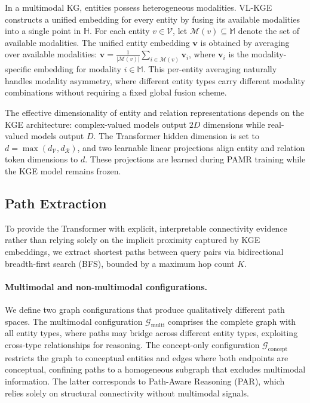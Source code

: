 \documentclass[runningheads]{llncs}
\begin{document}
In a multimodal KG, entities possess heterogeneous modalities.
VL-KGE~\cite{efthymiou2026vlkge} constructs a unified embedding for
every entity by fusing its available modalities into a single point
in $\mathbb{H}$.  For each entity $v \in \mathcal{V}$, let
$\mathcal{M}(v) \subseteq \mathbb{M}$ denote the set of available
modalities.  The unified entity embedding $\mathbf{v}$ is obtained
by averaging over available modalities:
$\mathbf{v} = \frac{1}{|\mathcal{M}(v)|} \sum_{i \in \mathcal{M}(v)} \mathbf{v}_i$,
where $\mathbf{v}_i$ is the modality-specific embedding for modality
$i \in \mathbb{M}$.  This per-entity averaging naturally handles
modality asymmetry, where different entity types carry different
modality combinations without requiring a fixed global fusion scheme.

The effective dimensionality of entity and relation representations
depends on the KGE architecture: complex-valued models output $2D$
dimensions while real-valued models output $D$. The Transformer
hidden dimension is set to $d = \max(d_{\mathcal{V}},
d_{\mathcal{R}})$, and two learnable linear projections align entity
and relation token dimensions to $d$. These
projections are learned during PAMR training while the KGE model
remains frozen.

\subsection{Path Extraction}
\label{sec:path-extraction}

To provide the Transformer with explicit, interpretable connectivity evidence rather than
relying solely on the implicit proximity captured by KGE embeddings, we extract shortest
paths between query pairs via bidirectional breadth-first search (BFS), bounded by a
maximum hop count $K$.

\paragraph{Multimodal and non-multimodal configurations.}
We define two graph configurations that produce qualitatively different path spaces.
The multimodal configuration $\mathcal{G}_{\text{multi}}$ comprises the complete
graph with all entity types, where paths may bridge across different entity types,
exploiting cross-type relationships for reasoning.  The concept-only configuration
$\mathcal{G}_{\text{concept}}$ restricts the graph to conceptual entities and
edges where both endpoints are conceptual, confining paths to a homogeneous
subgraph that excludes multimodal information.  The latter corresponds to
Path-Aware Reasoning (PAR), which relies solely on structural connectivity
without multimodal signals.
\end{document}

